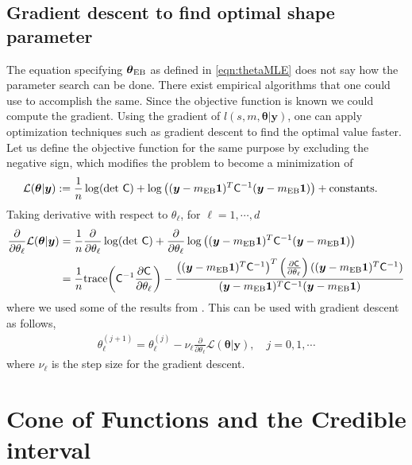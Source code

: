 \documentclass{svjour3}                     %
\newcommand{\bm}[1]{\boldsymbol{#1}}
\newcommand{\trace}[1]{\textup{trace}{#1}}
\newcommand{\vtheta}{{\bm{\theta}}}
\newcommand{\vy}{\bm{y}}
\newcommand{\vone}{\bm{1}}
\newcommand{\mC}{\mathsf{C}}
\newcommand{\mCInv}{\mathsf{C}^{-1}}
\newcommand{\MLE}{\textup{EB}}
\begin{document}
\subsection{Gradient descent to find optimal shape parameter} \label{grad_descent_MLE}
The equation specifying $\vtheta_\MLE$ as defined in \eqref{eqn:thetaMLE} does not say how the parameter search can be done. There exist empirical algorithms \cite{Bre73, For77} that one could use to accomplish the same.
Since the objective function is known we could compute the gradient.
Using the gradient of $l(s,m,\vtheta | \vy)$, one can apply optimization techniques such as gradient descent to find the optimal value faster. Let us define the objective function for the same purpose by excluding the negative sign, which modifies the problem to become a minimization of
\begin{align*}
\mathcal{L}(\vtheta | \vy)
&:= \frac{1}{n} \log(\det\, \mC) +  \log\left( (\vy-m_\MLE\vone)^T\mCInv(\vy-m_\MLE\vone) \right) + \text{constants.}
\end{align*}
Taking derivative with respect to $\theta_\ell$, for $\ell=1,\cdots,d$
\begin{align*}
\frac{\partial}{\partial \theta_\ell} \mathcal{L}(\vtheta | \vy)
&=  \frac{1}{n} \frac{\partial}{\partial \theta_\ell} \log(\det\, \mC) + \frac{\partial}{\partial \theta_\ell} 
\log\left((\vy-m_\MLE\vone)^T\mCInv(\vy-m_\MLE\vone) \right)
\\
&= \frac 1n \trace{\left( \mCInv \frac{\partial \mC}{\partial \theta_\ell} \right)}
- 
\frac
{\left((\vy-m_\MLE\vone)^T\mCInv\right)^T 
	\left( \frac{\partial \mC}{\partial \theta_\ell} \right)
	((\vy-m_\MLE\vone)^T\mCInv)}
{(\vy-m_\MLE\vone)^T\mCInv(\vy-m_\MLE\vone)}
\end{align*}
where we used some of the results from \cite{Dong2017a}. 
This can be used with gradient descent as follows,
\begin{align}
\label{eqn:deep_descent}
\theta_\ell^{(j+1)} = \theta_\ell^{(j)} - \nu_\ell \frac{\partial}{\partial \theta_\ell} \mathcal{L}(\vtheta | \vy), \quad j=0,1,\cdots
\end{align}
where $\nu_\ell$ is the step size for the gradient descent. 











\section{Cone of Functions and the Credible interval} %
\label{sec:cone_of_functions}
\end{document}

